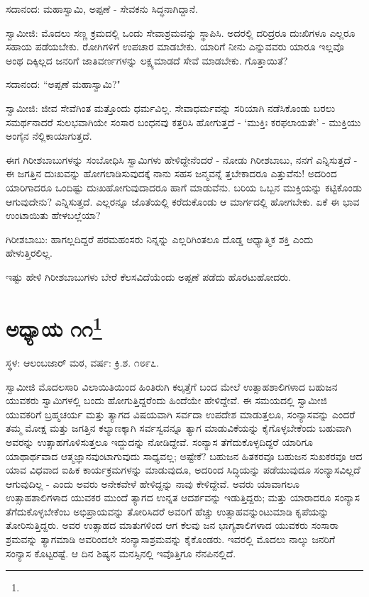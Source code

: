 ಸದಾನಂದ: ಮಹಾಸ್ವಾಮಿ, ಅಪ್ಪಣೆ - ಸೇವಕನು ಸಿದ್ಧನಾಗಿದ್ದಾನೆ.

ಸ್ವಾಮೀಜಿ: ಮೊದಲು ಸಣ್ಣ ಕ್ರಮದಲ್ಲಿ ಒಂದು ಸೇವಾಶ್ರಮವನ್ನು ಸ್ಥಾಪಿಸಿ. ಅದರಲ್ಲಿ ದರಿದ್ರರೂ ದುಃಖಿಗಳೂ ಎಲ್ಲರೂ ಸಹಾಯ ಪಡೆಯಬೇಕು. ರೋಗಿಗಳಿಗೆ ಉಪಚಾರ ಮಾಡಬೇಕು. ಯಾರಿಗೆ ನೀನು ಎನ್ನುವವರು ಯಾರೂ ಇಲ್ಲವೊ ಅಂಥ ದಿಕ್ಕಿಲ್ಲದ ಜನರಿಗೆ ಜಾತಿವರ್ಣಗಳನ್ನು ಲಕ್ಷ್ಯಮಾಡದೆ ಸೇವೆ ಮಾಡಬೇಕು. ಗೊತ್ತಾಯಿತೆ?

ಸದಾನಂದ: “ಅಪ್ಪಣೆ ಮಹಾಸ್ವಾಮಿ?"

ಸ್ವಾಮೀಜಿ: ಜೀವ ಸೇವೆಗಿಂತ ಮತ್ತೊಂದು ಧರ್ಮವಿಲ್ಲ. ಸೇವಾಧರ್ಮವನ್ನು ಸರಿಯಾಗಿ ನಡೆಸಿಕೊಂಡು ಬರಲು ಸಮರ್ಥನಾದರೆ ಸುಲಭವಾಗಿಯೇ ಸಂಸಾರ ಬಂಧನವು ಕತ್ತರಿಸಿ ಹೋಗುತ್ತದೆ - ‘ಮುಕ್ತಿಃ ಕರಫಲಾಯತೇ’ - ಮುಕ್ತಿಯು ಅಂಗೈನ ನೆಲ್ಲಿಕಾಯಾಗುತ್ತದೆ.

ಈಗ ಗಿರೀಶಬಾಬುಗಳನ್ನು ಸಂಬೋಧಿಸಿ ಸ್ವಾಮಿಗಳು ಹೇಳಿದ್ದೇನೆಂದರೆ - ನೋಡು ಗಿರೀಶಬಾಬು, ನನಗೆ ಎನ್ನಿಸುತ್ತದೆ - ಈ ಜಗತ್ತಿನ ದುಃಖವನ್ನು ಹೋಗಲಾಡಿಸುವುದಕ್ಕೆ ನಾನು ಸಹಸ ಜನ್ಮವನ್ನೆ ತ್ತಬೇಕಾದರೂ ಎತ್ತುವೆನು! ಅದರಿಂದ ಯಾರಿಗಾದರೂ ಒಂದಿಷ್ಟು ದುಃಖಹೋಗುವುದಾದರೂ ಹಾಗೆ ಮಾಡುವೆನು. ಬರಿಯ ಒಬ್ಬನ ಮುಕ್ತಿಯನ್ನು ಕಟ್ಟಿಕೊಂಡು ಆಗುವುದೇನು? ಎನ್ನಿಸುತ್ತದೆ. ಎಲ್ಲರನ್ನೂ ಜೊತೆಯಲ್ಲಿ ಕರೆದುಕೊಂಡು ಆ ಮಾರ್ಗದಲ್ಲಿ ಹೋಗಬೇಕು. ಏಕೆ ಈ ಭಾವ ಉಂಟಾಯಿತು ಹೇಳಬಲ್ಲೆಯಾ?

ಗಿರೀಶಬಾಬು: ಹಾಗಲ್ಲದಿದ್ದರೆ ಪರಮಹಂಸರು ನಿನ್ನನ್ನು ಎಲ್ಲರಿಗಿಂತಲೂ ದೊಡ್ಡ ಆಧ್ಯಾತ್ಮಿಕ ಶಕ್ತಿ ಎಂದು ಹೇಳುತ್ತಿರಲಿಲ್ಲ.

ಇಷ್ಟು ಹೇಳಿ ಗಿರೀಶಬಾಬುಗಳು ಬೇರೆ ಕೆಲಸವಿದೆಯೆಂದು ಅಪ್ಪಣೆ ಪಡೆದು ಹೊರಟುಹೋದರು.

\newpage

\chapter[ಅಧ್ಯಾಯ ೧೧]{ಅಧ್ಯಾಯ ೧೧\protect\footnote{}}

\centerline{ಸ್ಥಳ: ಆಲಂಬಜಾರ್ ಮಠ, ವರ್ಷ: ಕ್ರಿ.ಶ. ೧೮೯೭.}

ಸ್ವಾಮೀಜಿ ಮೊದಲಸಾರಿ ವಿಲಾಯಿತಿಯಿಂದ ಹಿಂತಿರುಗಿ ಕಲ್ಕತ್ತೆಗೆ ಬಂದ ಮೇಲೆ ಉತ್ಸಾಹಶಾಲಿಗಳಾದ ಬಹುಜನ ಯುವಕರು ಸ್ವಾಮಿಗಳಲ್ಲಿ ಬಂದು ಹೋಗುತ್ತಿದ್ದರೆಂದು ಹಿಂದೆಯೇ ಹೇಳಿದ್ದೇವೆ. ಈ ಸಮಯದಲ್ಲಿ ಸ್ವಾಮೀಜಿ ಯುವಕರಿಗೆ ಬ್ರಹ್ಮಚರ್ಯ ಮತ್ತು ತ್ಯಾಗದ ವಿಷಯವಾಗಿ ಸರ್ವದಾ ಉಪದೇಶ ಮಾಡುತ್ತಲೂ, ಸಂನ್ಯಾಸವನ್ನು ಎಂದರೆ ತಮ್ಮ ಮೋಕ್ಷ ಮತ್ತು ಜಗತ್ತಿನ ಕಲ್ಯಾಣಕ್ಕಾಗಿ ಸರ್ವಸ್ವವನ್ನೂ ತ್ಯಾಗ ಮಾಡುವಿಕೆಯನ್ನು ಕೈಗೊಳ್ಳಬೇಕೆಂದು ಬಹುವಾಗಿ ಅವರನ್ನು ಉತ್ಸಾಹಗೊಳಿಸುತ್ತಲೂ ಇದ್ದುದನ್ನು ನೋಡಿದ್ದೇವೆ. ಸಂನ್ಯಾಸ ತೆಗೆದುಕೊಳ್ಳದಿದ್ದರೆ ಯಾರಿಗೂ ಯಾಥಾರ್ಥವಾದ ಆತ್ಮಜ್ಞಾನವುಂಟಾಗುವುದು ಸಾಧ್ಯವಲ್ಲ; ಅಷ್ಟೇಕೆ? ಬಹುಜನ ಹಿತಕರವೂ ಬಹುಜನ ಸುಖಕರವೂ ಆದ ಯಾವ ವಿಧವಾದ ಐಹಿಕ ಕಾರ್ಯಕ್ರಮಗಳನ್ನು ಮಾಡುವುದೂ, ಅದರಿಂದ ಸಿದ್ಧಿಯನ್ನು ಪಡೆಯುವುದೂ ಸಂನ್ಯಾಸವಿಲ್ಲದೆ ಆಗುವುದಿಲ್ಲ - ಎಂದು ಅವರು ಅನೇಕವೇಳೆ ಹೇಳಿದ್ದನ್ನು ನಾವು ಕೇಳಿದ್ದೇವೆ. ಅವರು ಯಾವಾಗಲೂ ಉತ್ಸಾಹಶಾಲಿಗಳಾದ ಯುವಕರ ಮುಂದೆ ತ್ಯಾಗದ ಉನ್ನತ ಆದರ್ಶವನ್ನು ಇಡುತ್ತಿದ್ದರು; ಮತ್ತು ಯಾರಾದರೂ ಸಂನ್ಯಾಸ ತೆಗೆದುಕೊಳ್ಳಬೇಕೆಂಬ ಅಭಿಪ್ರಾಯವನ್ನು ತೋರಿಸಿದರೆ ಅವರಿಗೆ ಹೆಚ್ಚು ಉತ್ಸಾಹವನ್ನುಂಟುಮಾಡಿ ಕೃಪೆಯನ್ನು ತೋರಿಸುತ್ತಿದ್ದರು. ಅವರ ಉತ್ಸಾಹದ ಮಾತುಗಳಿಂದ ಆಗ ಕೆಲವು ಜನ ಭಾಗ್ಯಶಾಲಿಗಳಾದ ಯುವಕರು ಸಂಸಾರಾ ಶ್ರಮವನ್ನು ತ್ಯಾಗಮಾಡಿ ಅವರಿಂದಲೇ ಸಂನ್ಯಾಸಾಶ್ರಮವನ್ನು ಕೈಕೊಂಡರು. ಇವರಲ್ಲಿ ಮೊದಲು ನಾಲ್ಕು ಜನರಿಗೆ ಸಂನ್ಯಾಸ ಕೊಟ್ಟರಷ್ಟೆ. ಆ ದಿನ ಶಿಷ್ಯನ ಮನಸ್ಸಿನಲ್ಲಿ ಇವೊತ್ತಿಗೂ ನೆನಪಿನಲ್ಲಿದೆ.


